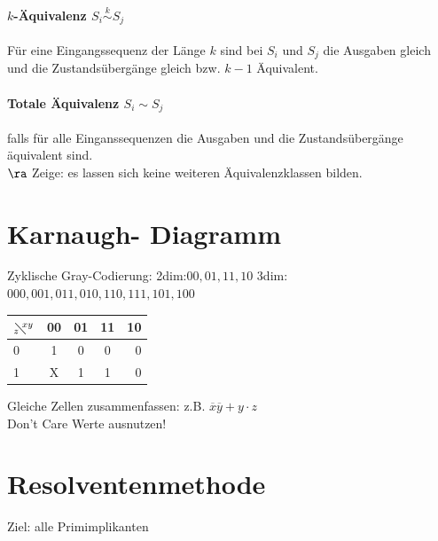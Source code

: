 \documentclass[6pt,a4paper]{scrartcl}
\begin{document}
\begin{multicols}{3}
\paragraph{$k$-Äquivalenz $S_i \stackrel{k}{\sim} S_j$} 
Für eine Eingangssequenz der Länge $k$ sind bei $S_i$ und $S_j$ die Ausgaben gleich und die Zustandsübergänge gleich bzw. $k-1$ Äquivalent.\\
\paragraph{Totale Äquivalenz $S_i \sim S_j$} falls für alle Einganssequenzen die Ausgaben und die Zustandsübergänge äquivalent sind. \\ $\ra$ Zeige: es lassen sich keine weiteren Äquivalenzklassen bilden.\\


\section{Karnaugh- Diagramm} %
	Zyklische Gray-Codierung: 2dim:$00,01,11,10$ 3dim:$000,001,011,010,110,111,101,100$
	
\begin{tabular}{l | c | c |  c | r}
$_z\!\!\diagdown \!\!^{xy}$ & 00 	& 	01	&	11 	&	10	 	\\ \midrule
0		&	1 \cellcolor{gray}	&	0	&	0	&	0		\\	
1		&	X \cellcolor{gray}	&	1 \cellcolor{lightgray}	&	1 \cellcolor{lightgray}	&	0		\\	
\end{tabular}
Gleiche Zellen zusammenfassen: z.B. $\overline x \overline y + y \cdot z$\\
Don't Care Werte ausnutzen!\\


\section{Resolventenmethode} %
\label{sec:Resolventenmethode}
	Ziel: alle Primimplikanten \\
	

\end{multicols}
\end{document}
